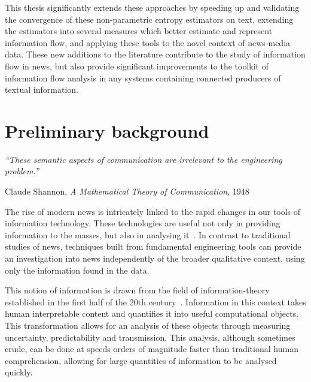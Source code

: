 This thesis significantly extends these approaches by speeding up and validating the convergence of these non-parametric entropy estimators on text, extending the estimators into several measures which better estimate and represent information flow, and applying these tools to the novel context of news-media data. These new additions to the literature contribute to the study of information flow in news, but also provide significant improvements to the toolkit of information flow analysis in any systems containing connected producers of textual information.


\section{Preliminary background}
\epigraph{\em ``These semantic aspects of communication are irrelevant to the engineering problem.''}{Claude Shannon, {\em A Mathematical Theory of Communication}, 1948}

The rise of modern news is intricately linked to the rapid changes in our tools of information technology. These technologies are useful not only in providing information to the masses, but also in analysing it~\cite{shannon_mathematical_1948,cover_elements_2012}. In contrast to traditional studies of news, techniques built from fundamental engineering tools can provide an investigation into news independently of the broader qualitative context, using only the information found in the data.   

This notion of information is drawn from the field of information-theory established in the first half of the 20th century~\cite{shannon_mathematical_1948,nyquist1924certain,hartley1928transmission}. Information in this context takes human interpretable content and quantifies it into useful computational objects. This transformation allows for an analysis of these objects through measuring uncertainty, predictability and transmission. This analysis, although sometimes crude, can be done at speeds orders of magnitude faster than traditional human comprehension, allowing for large quantities of information to be analysed quickly. 

